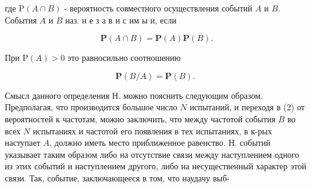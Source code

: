 \documentclass[10pt]{article}
\begin{document}
где $\mathrm{P}(A \cap B)$ - вероятность совместного осуществления событий $A$ и $B$. События $A$ и $B$ наз. н е з а в и с им ы и, если



\[

\mathbf{P}(A \cap B)=\mathbf{P}(A) \mathbf{P}(B) .

\]



При $\mathrm{P}(A)>0$ это равносильно соотношению



\[

\mathbf{P}(B / A)=\mathbf{P}(B) \text {. }

\]



Смысл данного определения Н. можно пояснить следующим образом. Предполагая, что производится большое число $N$ испытаний, и переходя в (2) от вероятностей к частотам, можно заключить, что между частотой события $B$ во всех $N$ испытаниях и частотой его появления в тех испытаниях, в к-рых наступает $A$, должно иметь место приближенное равенство. Н. событий указывает таким образом либо на отсутствие связи между наступлением одного из этих событий и наступлением другого, либо на несущественный характер этой связи. Так, событие, заключающееся в том, что наудачу выб-
\end{document}
